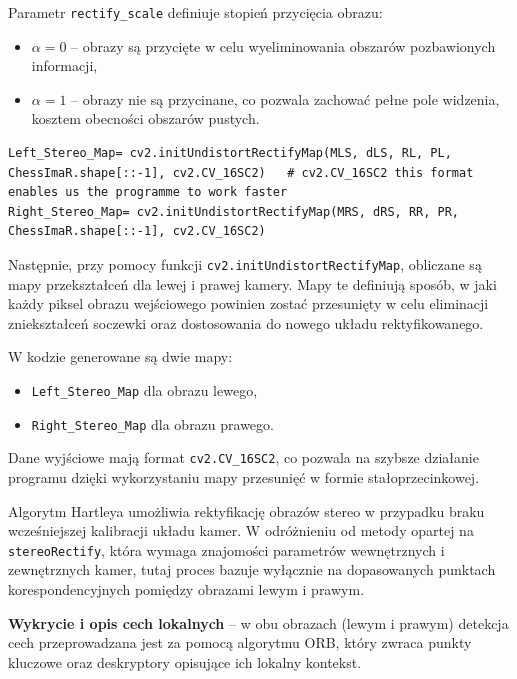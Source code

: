 \documentclass[magisterska]{pracadypl}
\begin{document}
Parametr \texttt{rectify\_scale} definiuje stopień przycięcia obrazu:

\begin{itemize}
    \item $\alpha = 0$ – obrazy są przycięte w celu wyeliminowania obszarów pozbawionych informacji,
    \item $\alpha = 1$ – obrazy nie są przycinane, co pozwala zachować pełne pole widzenia, kosztem obecności obszarów pustych.
\end{itemize}

\begin{lstlisting}[style=mypython]
Left_Stereo_Map= cv2.initUndistortRectifyMap(MLS, dLS, RL, PL, ChessImaR.shape[::-1], cv2.CV_16SC2)   # cv2.CV_16SC2 this format enables us the programme to work faster
Right_Stereo_Map= cv2.initUndistortRectifyMap(MRS, dRS, RR, PR, ChessImaR.shape[::-1], cv2.CV_16SC2)
\end{lstlisting}

Następnie, przy pomocy funkcji \texttt{cv2.initUndistortRectifyMap}, obliczane są mapy przekształceń dla lewej i prawej kamery. 
Mapy te definiują sposób, w jaki każdy piksel obrazu wejściowego powinien zostać przesunięty w celu eliminacji zniekształceń soczewki oraz dostosowania do nowego układu rektyfikowanego.

W kodzie generowane są dwie mapy:

\begin{itemize}
    \item \texttt{Left\_Stereo\_Map} dla obrazu lewego,
    \item \texttt{Right\_Stereo\_Map} dla obrazu prawego.
\end{itemize}

Dane wyjściowe mają format \texttt{cv2.CV\_16SC2}, co pozwala na szybsze działanie programu dzięki wykorzystaniu mapy przesunięć w formie stałoprzecinkowej.

Algorytm Hartleya \cite{hartley} umożliwia rektyfikację obrazów stereo w przypadku braku wcześniejszej kalibracji układu kamer. W odróżnieniu od metody opartej na \texttt{stereoRectify}, która wymaga znajomości parametrów wewnętrznych i zewnętrznych kamer, tutaj proces bazuje wyłącznie na dopasowanych punktach korespondencyjnych pomiędzy obrazami lewym i prawym.

\textbf{Wykrycie i opis cech lokalnych} – w obu obrazach (lewym i prawym) detekcja cech przeprowadzana jest za pomocą algorytmu ORB, który zwraca punkty kluczowe oraz deskryptory opisujące ich lokalny kontekst.
\end{document}
